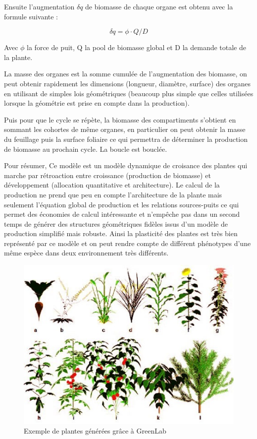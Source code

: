 {Ensuite l’augmentation $\delta q$ de biomasse de chaque organe est obtenu avec la formule suivante :

\[ \delta q = \phi \cdot Q/D \]

Avec $\phi$ la force de puit, Q la pool de biomasse global et D la demande totale de la plante.

La masse des organes est la somme cumulée de l’augmentation des biomasse, on peut obtenir rapidement les dimensions (longueur, diamètre, surface) des organes en utilisant de simples lois géométriques (beaucoup plus simple que celles utilisées lorsque la géométrie est prise en compte dans la production). 

Puis pour que le cycle se répète, la biomasse des compartiments s’obtient  en sommant les cohortes de même organes, en particulier on peut obtenir la masse du feuillage puis la surface foliaire ce qui permettra de déterminer la production de biomasse au prochain cycle. La boucle est bouclée.

Pour résumer, Ce modèle est un modèle dynamique de croisance des plantes qui marche par rétroaction entre croissance (production de biomasse) et développement (allocation quantitative et architecture). Le calcul de la production ne prend que peu en compte l’architecture de la plante mais seulement l’équation global de production et les relations sources-puits ce qui permet des économies de calcul intéressante et n’empêche pas dans un second temps de générer des structures géométriques fidèles issus d’un modèle de production simplifié mais robuste. Ainsi la plasticité des plantes est très bien représenté par ce modèle et on peut rendre compte de différent phénotypes d’une même espèce dans deux environnement très différents.

\begin{figure}[h]
	\begin{center}
	
	
  \includegraphics[scale=1.0]{./img/exempleGL1.jpg}
  \caption{Exemple de plantes générées grâce à GreenLab}
  \label{fig:exempleGL1}
  

\end{center}
\end{figure}}
